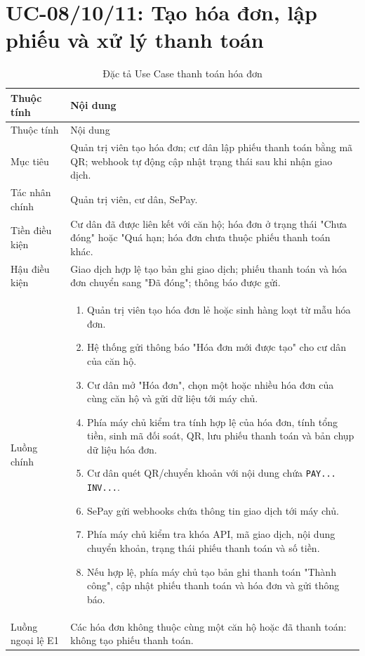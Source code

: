 ﻿\documentclass[12pt,a4paper]{report}
\begin{document}
\section{UC-08/10/11: Tạo hóa đơn, lập phiếu và xử lý thanh toán}
\begin{longtable}{L{4cm} L{10.5cm}}
\caption{Đặc tả Use Case thanh toán hóa đơn}\label{tab:uc-payment}\\
\toprule
Thuộc tính & Nội dung \\
\midrule
\endfirsthead
\toprule Thuộc tính & Nội dung \\\midrule
\endhead
Mục tiêu & Quản trị viên tạo hóa đơn; cư dân lập phiếu thanh toán bằng mã QR; webhook tự động cập nhật trạng thái sau khi nhận giao dịch. \\
Tác nhân chính & Quản trị viên, cư dân, SePay. \\
Tiền điều kiện & Cư dân đã được liên kết với căn hộ; hóa đơn ở trạng thái "Chưa đóng" hoặc "Quá hạn; hóa đơn chưa thuộc phiếu thanh toán khác. \\
Hậu điều kiện & Giao dịch hợp lệ tạo bản ghi giao dịch; phiếu thanh toán và hóa đơn chuyển sang "Đã đóng"; thông báo được gửi. \\
Luồng chính & \begin{enumerate}
\item Quản trị viên tạo hóa đơn lẻ hoặc sinh hàng loạt từ mẫu hóa đơn.
\item Hệ thống gửi thông báo "Hóa đơn mới được tạo" cho cư dân của căn hộ.
\item Cư dân mở "Hóa đơn", chọn một hoặc nhiều hóa đơn của cùng căn hộ và gửi dữ liệu tới máy chủ.
\item Phía máy chủ kiểm tra tính hợp lệ của hóa đơn, tính tổng tiền, sinh mã đối soát, QR, lưu phiếu thanh toán và bản chụp dữ liệu hóa đơn.
\item Cư dân quét QR/chuyển khoản với nội dung chứa \texttt{PAY... INV...}.
\item SePay gửi webhooks chứa thông tin giao dịch tới máy chủ.
\item Phía máy chủ kiểm tra khóa API, mã giao dịch, nội dung chuyển khoản, trạng thái phiếu thanh toán và số tiền.
\item Nếu hợp lệ, phía máy chủ tạo bản ghi thanh toán "Thành công", cập nhật phiếu thanh toán và hóa đơn và gửi thông báo.
\end{enumerate} \\
Luồng ngoại lệ E1 & Các hóa đơn không thuộc cùng một căn hộ hoặc đã thanh toán: không tạo phiếu thanh toán. \\

\end{longtable}
\end{document}
